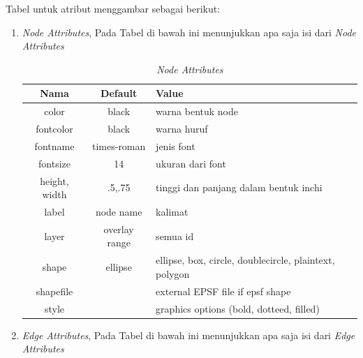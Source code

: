 \begin{enumerate}
Tabel untuk atribut menggambar sebagai berikut:
\begin{enumerate}
\item \textit{Node Attributes}, Pada Tabel di bawah ini menunjukkan apa saja isi dari \textit{Node Attributes}
\begin{table}[H]
\begin{center}
\caption{\textit{Node Attributes}}
\begin{tabular}{|c|c|l|}
\hline
  Nama & Default & Value \\
\hline
  color & black & warna bentuk node \\
  fontcolor & black & warna huruf \\
  fontname & times-roman & jenis font \\
  fontsize & 14 & ukuran dari font \\
  height, width & .5,.75 & tinggi dan panjang dalam bentuk inchi \\
  label & node name & kalimat \\
  layer & overlay range & semua id \\
  shape & ellipse & ellipse, box, circle, doublecircle, plaintext, polygon \\
  shapefile & & external EPSF file if epsf shape \\
  style & & graphics options (bold, dotteed, filled)\\
\hline
\end{tabular}
\end{center}
\end{table}

\item \textit{Edge Attributes}, Pada Tabel di bawah ini menunjukkan apa saja isi dari \textit{Edge Attributes} \\


\end{enumerate}
\end{enumerate}
